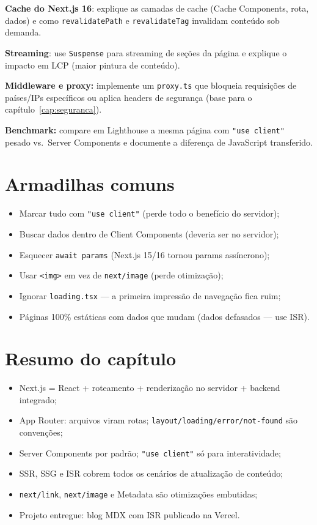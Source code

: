 \begin{seniores}
  \item \textbf{Cache do Next.js 16}: explique as camadas de cache (Cache Components, rota, dados) e como \texttt{revalidatePath} e \texttt{revalidateTag} invalidam conteúdo sob demanda.
  \item \textbf{Streaming}: use \texttt{Suspense} para streaming de seções da página e explique o impacto em LCP (maior pintura de conteúdo).
  \item \textbf{Middleware e proxy:} implemente um \texttt{proxy.ts} que bloqueia requisições de países/IPs específicos ou aplica headers de segurança (base para o capítulo~\ref{cap:seguranca}).
  \item \textbf{Benchmark:} compare em Lighthouse a mesma página com \texttt{"use client"} pesado vs.\ Server Components e documente a diferença de JavaScript transferido.
\end{seniores}

\section{Armadilhas comuns}

\begin{itemize}[leftmargin=*, itemsep=0.4em]
  \item Marcar tudo com \texttt{"use client"} (perde todo o benefício do servidor);
  \item Buscar dados dentro de Client Components (deveria ser no servidor);
  \item Esquecer \texttt{await params} (Next.js 15/16 tornou params assíncrono);
  \item Usar \texttt{<img>} em vez de \texttt{next/image} (perde otimização);
  \item Ignorar \texttt{loading.tsx} — a primeira impressão de navegação fica ruim;
  \item Páginas 100\% estáticas com dados que mudam (dados defasados — use ISR).
\end{itemize}

\section{Resumo do capítulo}

\begin{itemize}[leftmargin=*, itemsep=0.3em]
  \item Next.js = React + roteamento + renderização no servidor + backend integrado;
  \item App Router: arquivos viram rotas; \texttt{layout/loading/error/not-found} são convenções;
  \item Server Components por padrão; \texttt{"use client"} só para interatividade;
  \item SSR, SSG e ISR cobrem todos os cenários de atualização de conteúdo;
  \item \texttt{next/link}, \texttt{next/image} e Metadata são otimizações embutidas;
  \item Projeto entregue: blog MDX com ISR publicado na Vercel.
\end{itemize}

